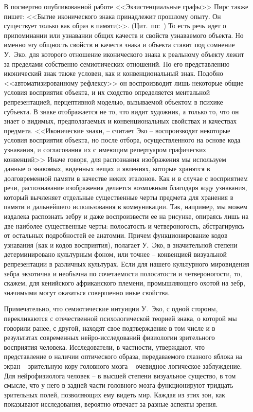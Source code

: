 В посмертно опубликованной работе
<<Экзистенциальные графы>> Пирс также пишет: <<Бытие иконического знака принадлежит
прошлому опыту. Он существует только как образ в памяти>>.
(Цит.~по:~\autocite{jakobson1983}) То есть речь идет о припоминании или
узнавании общих качеств и свойств узнаваемого объекта. Но именно эту общность
свойств и качеств знака и объекта ставит под сомнение У.~Эко, для которого
отношение иконического знака к реальному объекту лежит за пределами собственно
семиотических отношений. По его представлению иконический знак также условен,
как и конвенциональный знак. Подобно <<автоматизированному рефлексу>>  он
воспроизводит лишь некоторые общие условия восприятия объекта, и их сходство
определяется ментальной репрезентацией, перцептивной моделью, вызываемой
объектом в психике субъекта. В знаке отображается не то, что видит художник,
а только то, что он знает о видимых, предполагаемых и конвенциональных свойствах
и качествах предмета. <<Иконические знаки, -- считает Эко -- воспроизводят
некоторые условия восприятия объекта, но после отбора, осуществленного на
основе кода узнавания, и согласования их с имеющим репертуаром графических
конвенций>>\autocite[][160]{eko1998} Иначе говоря, для распознания
изображения мы используем данные о знакомых, виденных вещах и явлениях, которые
хранятся в долговременной памяти в качестве неких эталонов.  Как и в случае с
восприятием речи, распознавание изображения делается возможным благодаря коду
узнавания, который вычленяет отдельные существенные черты предмета для хранения
в памяти и дальнейшего использования в коммуникации. Так, например, мы можем
издалека распознать зебру и даже воспроизвести ее на рисунке, опираясь лишь на
две наиболее существенные черты: полосатость и четвероногость, абстрагируясь от
остальных подробностей ее анатомии. Причем функционирование кодов узнавания
(как и кодов восприятия), полагает У.~Эко, в значительной степени детерминировано
культурным фоном, или точнее -- конвенцией визуальной репрезентации в различных
культурах. Если для нашего культурного мировидения  зебра экзотична и необычна
по сочетаемости полосатости и четвероногости, то, скажем, для кенийского
африканского племени, промышляющего охотой на зебр, значимыми могут оказаться
совершенно иные свойства\autocite[][160]{eko1998}.

Примечательно, что семиотические интуиции У.~Эко, с одной стороны, перекликаются
с отечественной психологической теорией знака, о которой мы говорили ранее,
с другой,  находят свое подтверждение в том числе и в результатах современных
нейро-исследований физиологии зрительного восприятия человека. Исследователи,
в частности, утверждают, что представление о наличии оптического образа,
передаваемого глазного яблока на экран -- зрительную кору головного мозга --
очевидное логическое заблуждение. Для нейрофизиолога человек -- в высшей степени
визуальное существо, в том смысле, что у него в задней части головного
мозга функционируют тридцать зрительных полей, позволяющих ему видеть мир.
Каждая из этих зон, как показывают исследования, вероятно отвечает за разные
аспекты зрения\autocite{velyanur2006}.

